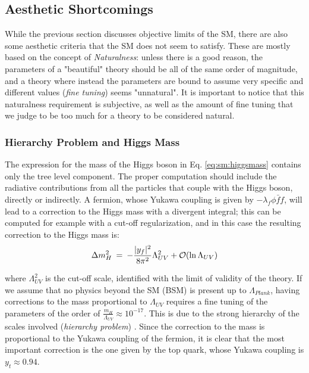 \subsection{Aesthetic Shortcomings}
\label{sec:sm:aesthetics}

While the previous section discusses objective limits of the SM, there are also some aesthetic criteria that the SM does not seem to satisfy. These are mostly based on the concept of \textit{Naturalness}: unless there is a good reason, the parameters of a "beautiful" theory should be all of the same order of magnitude, and a theory where instead the parameters are bound to assume very specific and different values (\textit{fine tuning}) seems "unnatural". It is important to notice that this naturalness requirement is subjective, as well as the amount of fine tuning that we judge to be too much for a theory to be considered natural.


\subsubsection*{Hierarchy Problem and Higgs Mass}

The expression for the mass of the Higgs boson in Eq. \ref{eq:sm:higgsmass} contains only the tree level component. The proper computation should include the radiative contributions from all the particles that couple with the Higgs boson, directly or indirectly. A fermion, whose Yukawa coupling is given by $-\lambda_f \phi \bar{f} f$, will lead to a correction to the Higgs mass with a divergent integral; this can be computed for example with a cut-off regularization, and in this case the resulting correction to the Higgs mass is:
\begin{equation}
\Delta m_H^2 \>=\>  
-{|y_f|^2\over 8 \pi^2} \Lambda_{UV}^2 + \mathcal{O}(\ln \Lambda_{UV} )
\label{eq:divhf}
\end{equation}

where $\Lambda_{UV}^2$ is the cut-off scale, identified with the limit of validity of the theory. If we assume that no physics beyond the SM (BSM) is present up to $\Lambda_{Plank}$, having corrections to the mass proportional to $\Lambda_{UV}$ requires a fine tuning of the parameters of the order of $\frac{m_H}{\Lambda_{UV}} \approx 10^{-17}$. This is due to the strong hierarchy of the scales involved (\textit{hierarchy problem}) \cite{Weinberg:1975gm}\cite{PhysRevD.20.2619}\cite{PhysRevD.14.1667}\cite{tHooft:1979rat}. Since the correction to the mass is proportional to the Yukawa coupling of the fermion, it is clear that the most important correction is the one given by the top quark, whose Yukawa coupling is $y_t \approx 0.94$. 

